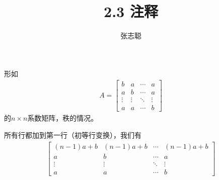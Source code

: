 \documentclass{article}
\begin{document}
\title{2.3 注释}
\author{张志聪}
\maketitle

\begin{zremark}
  形如
  \begin{align*}
    A = \begin{bmatrix}
          b      & a      & \cdots & a      \\
          a      & b      & \cdots & a      \\
          \vdots & \vdots & \ddots & \vdots \\
          a      & a      & \cdots & b
        \end{bmatrix}
  \end{align*}
  的$n \times n$系数矩阵，秩的情况。
\end{zremark}

所有行都加到第一行（初等行变换），我们有
\begin{align*}
  \begin{bmatrix}
    (n - 1)a + b & (n - 1)a + b & \cdots & (n - 1)a + b \\
    a            & b            & \cdots & a            \\
    \vdots       & \vdots       & \ddots & \vdots       \\
    a            & a            & \cdots & b
  \end{bmatrix}
\end{align*}
\end{document}
